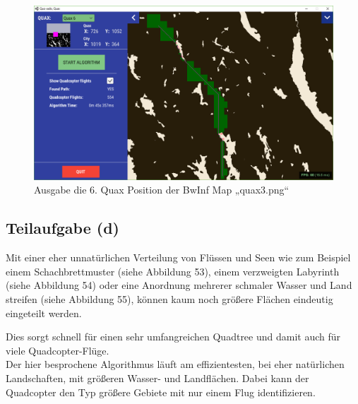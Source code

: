 \documentclass[a4paper,12pt]{article}
\begin{document}
\begin{figure}[H]
\centering
    \includegraphics[width=1\linewidth]{Bilder/Aufgabe3/Programm/quax3_06.png}
    \caption{Ausgabe die 6. Quax Position der BwInf Map „quax3.png“}
\end{figure}

\subsection{Teilaufgabe (d)}
Mit einer eher unnatürlichen Verteilung von Flüssen und Seen wie zum Beispiel einem Schachbrettmuster (siehe Abbildung 53), einem verzweigten Labyrinth (siehe Abbildung 54) oder eine Anordnung mehrerer schmaler Wasser und Land streifen (siehe Abbildung 55), können kaum noch größere Flächen eindeutig eingeteilt werden.

Dies sorgt schnell für einen sehr umfangreichen Quadtree und damit auch für viele Quadcopter-Flüge.
\\[0.4cm]
Der hier besprochene Algorithmus läuft am effizientesten, bei eher natürlichen Landschaften, mit größeren Wasser- und Landflächen. Dabei kann der Quadcopter den Typ größere Gebiete mit nur einem Flug identifizieren.
\end{document}
